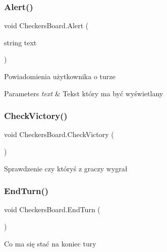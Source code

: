 \subsubsection{\texorpdfstring{Alert()}{Alert()}}
{\footnotesize\ttfamily void Checkers\+Board.\+Alert (\begin{DoxyParamCaption}\item[{string}]{text }\end{DoxyParamCaption})}



Powiadomienia użytkownika o turze 


\begin{DoxyParams}{Parameters}
{\em text} & Tekst który ma być wyświetlany\\
\hline
\end{DoxyParams}
\mbox{\label{class_checkers_board_ac148b117df6e0d374ff9a35b0e0854d2}} 
\subsubsection{\texorpdfstring{CheckVictory()}{CheckVictory()}}
{\footnotesize\ttfamily void Checkers\+Board.\+Check\+Victory (\begin{DoxyParamCaption}{ }\end{DoxyParamCaption})\hspace{0.3cm}{\ttfamily [private]}}



Sprawdzenie czy któryś z graczy wygrał 

\mbox{\label{class_checkers_board_a149bffb6407cae2045c8545a90306d82}} 
\subsubsection{\texorpdfstring{EndTurn()}{EndTurn()}}
{\footnotesize\ttfamily void Checkers\+Board.\+End\+Turn (\begin{DoxyParamCaption}{ }\end{DoxyParamCaption})\hspace{0.3cm}{\ttfamily [private]}}



Co ma się stać na koniec tury 

